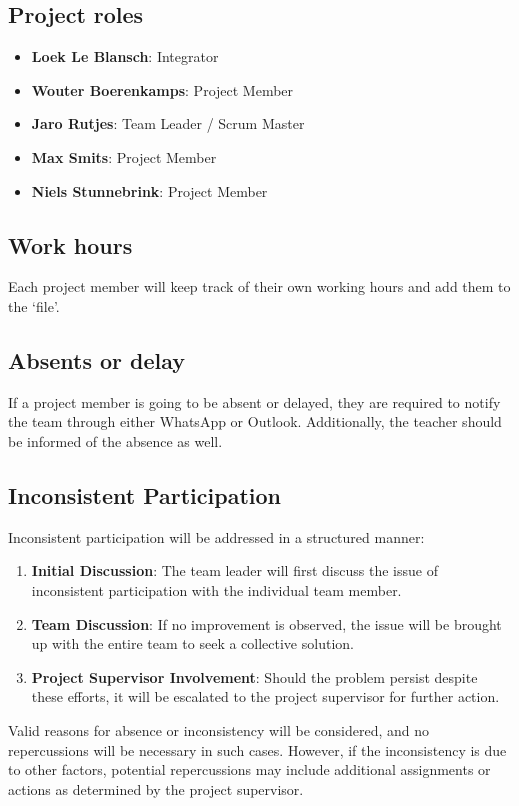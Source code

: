 \documentclass{projdoc}
\begin{document}
\subsection{Project roles}
\begin{itemize}
	\item \textbf{Loek Le Blansch}: Integrator
	\item \textbf{Wouter Boerenkamps}: Project Member
	\item \textbf{Jaro Rutjes}: Team Leader / Scrum Master
	\item \textbf{Max Smits}: Project Member
	\item \textbf{Niels Stunnebrink}: Project Member
\end{itemize}


\subsection{Work hours}
Each project member will keep track of their own working hours and 
add them to the `file'.

\subsection{Absents or delay}
If a project member is going to be absent or delayed, they are required to 
notify the team through either WhatsApp or Outlook. Additionally, the teacher 
should be informed of the absence as well.

\subsection{Inconsistent Participation}
Inconsistent participation will be addressed in a structured manner:

\begin{enumerate}
	\item \textbf{Initial Discussion}: The team leader will first discuss the 
	issue of inconsistent participation with the individual team member.
	\item \textbf{Team Discussion}: If no improvement is observed, the issue 
	will be brought up with the entire team to seek a collective solution.
	\item \textbf{Project Supervisor Involvement}: Should the problem persist 
	despite these efforts, it will be escalated to the project supervisor for 
	further action.
\end{enumerate}

Valid reasons for absence or inconsistency will be considered, and no 
repercussions will be necessary in such cases. However, if the inconsistency is 
due to other factors, potential repercussions may include additional assignments
 or actions as determined by the project supervisor.
 
\end{document}
